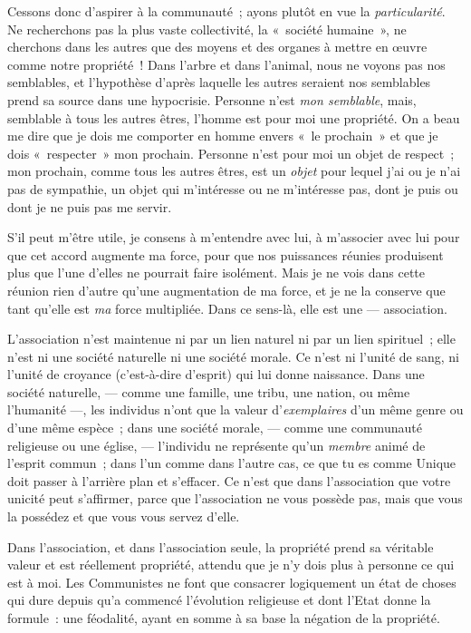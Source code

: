 \documentclass[french,twoside]{book} %
\begin{document}
Cessons donc d’aspirer à la communauté ; ayons plutôt en vue la \emph{particularité}. Ne recherchons pas la plus vaste collectivité, la « société humaine », ne cherchons dans les autres que des moyens et des organes à mettre en œuvre comme notre propriété ! Dans l’arbre et dans l’animal, nous ne voyons pas nos semblables, et l’hypothèse d’après laquelle les autres seraient nos semblables prend sa source dans une hypocrisie. Personne n’est \emph{mon semblable}, mais,  semblable à tous les autres êtres, l’homme est pour moi une propriété. On a beau me dire que je dois me comporter en homme envers « le prochain » et que je dois « respecter » mon prochain. Personne n’est pour moi un objet de respect ; mon prochain, comme tous les autres êtres, est un \emph{objet} pour lequel j’ai ou je n’ai pas de sympathie, un objet qui m’intéresse ou ne m’intéresse pas, dont je puis ou dont je ne puis pas me servir.\par
S’il peut m’être utile, je consens à m’entendre avec lui, à m’associer avec lui pour que cet accord augmente ma force, pour que nos puissances réunies produisent plus que l’une d’elles ne pourrait faire isolément. Mais je ne vois dans cette réunion rien d’autre qu’une augmentation de ma force, et je ne la conserve que tant qu’elle est \emph{ma} force multipliée. Dans ce sens-là, elle est une — association.\par
L’association n’est maintenue ni par un lien naturel ni par un lien spirituel ; elle n’est ni une société naturelle ni une société morale. Ce n’est ni l’unité de sang, ni l’unité de croyance (c’est-à-dire d’esprit) qui lui donne naissance. Dans une société naturelle, — comme une famille, une tribu, une nation, ou même l’humanité —, les individus n’ont que la valeur d’\emph{exemplaires} d’un même genre ou d’une même espèce ; dans une société morale, — comme une communauté religieuse ou une église, — l’individu ne représente qu’un \emph{membre} animé de l’esprit commun ; dans l’un comme dans l’autre cas, ce que tu es comme Unique doit passer à l’arrière plan et s’effacer. Ce n’est que dans l’association que votre unicité peut s’affirmer, parce que l’association ne vous possède pas, mais que vous la possédez et que vous vous servez d’elle.\par
Dans l’association, et dans l’association seule, la propriété prend sa véritable valeur et est réellement propriété, attendu que je n’y dois plus à personne ce qui est à moi. Les Communistes ne font que consacrer  logiquement un état de choses qui dure depuis qu’a commencé l’évolution religieuse et dont l’Etat donne la formule : une féodalité, ayant en somme à sa base la négation de la propriété.\par
\end{document}
